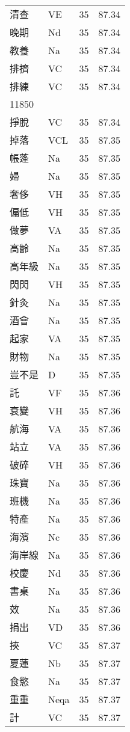 \documentclass[twocolumn]{book}
\begin{document}
\begin{supertabular}{llrr}
清查 & VE & 35 &  87.34\\
晚期 & Nd & 35 &  87.34\\
教養 & Na & 35 &  87.34\\
排擠 & VC & 35 &  87.34\\
排練 & VC & 35 &  87.34\\
11850\\
掙脫 & VC & 35 &  87.34\\
掉落 & VCL & 35 &  87.35\\
帳蓬 & Na & 35 &  87.35\\
婦 & Na & 35 &  87.35\\
奢侈 & VH & 35 &  87.35\\
偏低 & VH & 35 &  87.35\\
做夢 & VA & 35 &  87.35\\
高齡 & Na & 35 &  87.35\\
高年級 & Na & 35 &  87.35\\
閃閃 & VH & 35 &  87.35\\
針灸 & Na & 35 &  87.35\\
酒會 & Na & 35 &  87.35\\
起家 & VA & 35 &  87.35\\
財物 & Na & 35 &  87.35\\
豈不是 & D & 35 &  87.35\\
託 & VF & 35 &  87.36\\
衰變 & VH & 35 &  87.36\\
航海 & VA & 35 &  87.36\\
站立 & VA & 35 &  87.36\\
破碎 & VH & 35 &  87.36\\
珠寶 & Na & 35 &  87.36\\
班機 & Na & 35 &  87.36\\
特產 & Na & 35 &  87.36\\
海濱 & Nc & 35 &  87.36\\
海岸線 & Na & 35 &  87.36\\
校慶 & Nd & 35 &  87.36\\
書桌 & Na & 35 &  87.36\\
效 & Na & 35 &  87.36\\
捐出 & VD & 35 &  87.36\\
挾 & VC & 35 &  87.37\\
夏蓮 & Nb & 35 &  87.37\\
食慾 & Na & 35 &  87.37\\
重重 & Neqa & 35 &  87.37\\
計 & VC & 35 &  87.37\\

\end{supertabular}
\end{document}
